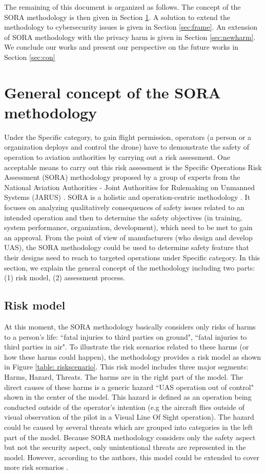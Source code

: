 \documentclass[a4paper, 10, conference]{ieeeconf}  %
\begin{document}
The remaining of this document is organized as follows. The concept of the SORA methodology is then given in Section \ref{sec:concept}. A solution to extend the methodology to cybersecurity issues is given in Section \ref{sec:frame}. An extension of SORA methodology with the privacy harm is given in Section \ref{sec:newharm}. We conclude our works and present our perspective on the future works in Section \ref{sec:con}


\section{General concept of the SORA methodology} \label{sec:concept}

 Under the Specific category, to gain flight permission, operators (a person or a organization deploys and control the drone) have to demonstrate the safety of operation to aviation authorities by carrying out a risk assessment. One acceptable means to carry out this risk assessment is the  Specific Operations Risk Assessment (SORA) methodology proposed by a group of experts from the National Aviation Authorities - Joint Authorities for Rulemaking on Unmanned Systems (JARUS) \cite{EASA_AMC, EASA_SORA}. SORA is a holistic and operation-centric methodology \cite{dlr121660}.  It focuses on analyzing qualitatively consequences of safety issues related to an intended operation and then to determine the safety objectives (in training, system performance, organization, development), which need to be met to gain an  approval. From the point of view of manufacturers (who design and develop UAS), the SORA methodology could be used to determine safety feature that their designs need to reach to targeted operations under Specific category. In this section, we explain the general concept of the methodology including two parts: (1) risk model, (2) assessment process.

\subsection{Risk model}

 At this moment, the SORA methodology basically considers only risks of harms to a person's life: ``fatal injuries to third parties on ground", ``fatal injuries to third parties in air". To illustrate the risk scenarios related to these harms (or how these harms could happen), the methodology provides a risk model as shown in Figure \ref{table: riskscenario}. This risk model includes three major segments: Harms, Hazard, Threats. The harms are in the right part of the model. The direct causes of these harms is a generic hazard ``UAS operation out of control" shown in the center of the model. This hazard is defined as an operation being conducted outside of the operator's intention (e.g the aircraft flies outside of visual observation of the pilot in a Visual Line Of Sight operation). The hazard could be caused by several threats which are grouped into categories in the left part of the model. Because SORA methodology considers only the safety aspect but not the security aspect, only unintentional threats are represented in the model. However, according to the authors, this model could be extended to cover more risk scenarios \cite{SORAV1}.
 
\end{document}
